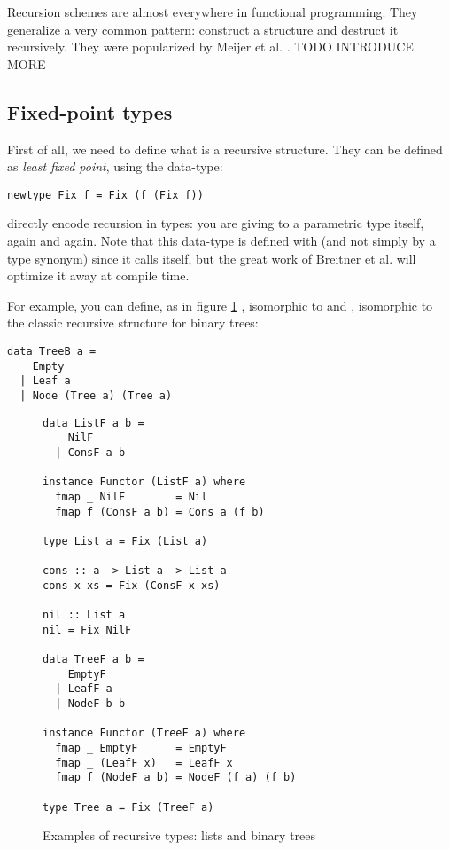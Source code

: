 
Recursion schemes are almost everywhere in functional programming. They generalize a very common pattern: construct a structure and destruct it recursively. They were popularized by Meijer et al. \cite{4cec4a43c86444479dc0003182424795}. TODO INTRODUCE MORE

\subsection{Fixed-point types}
\label{subsec:defi}
First of all, we need to define what is a recursive structure. They can be defined as \emph{least fixed point}, using the  data-type:
\begin{verbatim}
newtype Fix f = Fix (f (Fix f))
\end{verbatim}
 directly encode recursion in types: you are giving to a parametric type itself, again and again. Note that this data-type is defined with  (and not simply by a type synonym) since it calls itself, but the great work of Breitner et al. \cite{Breitner:2014:SZC:2692915.2628141} will optimize it away at compile time.

For example, you can define, as in figure \ref{fig:listtree}
, isomorphic to \minline{[a]} and , isomorphic to the classic recursive structure for binary trees:
\begin{verbatim}
data TreeB a =
    Empty
  | Leaf a
  | Node (Tree a) (Tree a)
\end{verbatim}

\begin{figure}
\begin{verbatim}
data ListF a b =
    NilF
  | ConsF a b

instance Functor (ListF a) where
  fmap _ NilF        = Nil
  fmap f (ConsF a b) = Cons a (f b)

type List a = Fix (List a)

cons :: a -> List a -> List a
cons x xs = Fix (ConsF x xs)

nil :: List a
nil = Fix NilF

data TreeF a b =
    EmptyF
  | LeafF a
  | NodeF b b

instance Functor (TreeF a) where
  fmap _ EmptyF      = EmptyF
  fmap _ (LeafF x)   = LeafF x
  fmap f (NodeF a b) = NodeF (f a) (f b)

type Tree a = Fix (TreeF a)
\end{verbatim}
\caption{Examples of recursive types: lists and binary trees}
\label{fig:listtree}
\end{figure}

